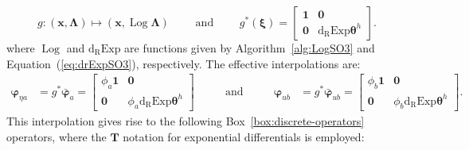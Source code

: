 %
\begin{equation*} 
g: (\bm{x}, \bm{\Lambda})\mapsto (\bm{x}, \operatorname{Log} \bm{\Lambda})
\qquad\text{ and }\qquad
{{g}}^*(\bm{\xi}) = \begin{bmatrix}
\mathbf{1} & \mathbf{0}\\
\mathbf{0} & \operatorname{d_{\scriptscriptstyle{R}}Exp}\bm{\theta}^h
\end{bmatrix}.
\end{equation*}
where \(\operatorname{Log}\) and \(\operatorname{d_{\scriptscriptstyle{R}}Exp}\)
are functions given by Algorithm~\ref{alg:LogSO3} and Equation~(\ref{eq:drExpSO3}), respectively.
The effective interpolations are:
%
\begin{equation*} 
\begin{aligned}
\bm{\varphi}^{}_{\eta a} &= g^*\bar{\bm{\varphi}}^{}_a %
=\begin{bmatrix}
    \phi_a \mathbf{1} & \mathbf{0} \\
    \mathbf{0} & \phi_a \operatorname{d_{\scriptscriptstyle{R}}Exp} \bm{\theta}^h
    \end{bmatrix} 
\end{aligned} 
\qquad\text{ and }\qquad 
\begin{aligned}
\bm{\varphi}^{}_{u b} &= g^*\bar{\bm{\varphi}}_{u b} %
= \begin{bmatrix}
    \phi_b \mathbf{1} & \mathbf{0} \\
    \mathbf{0} & \phi_b \operatorname{d_{\scriptscriptstyle{R}}Exp} \bm{\theta}^h
    \end{bmatrix} .
\end{aligned}
\end{equation*}
%
This interpolation gives rise to the following Box~\ref{box:discrete-operators} operators, where the \(\mathbf{T}\) notation for exponential differentials is employed:
%

